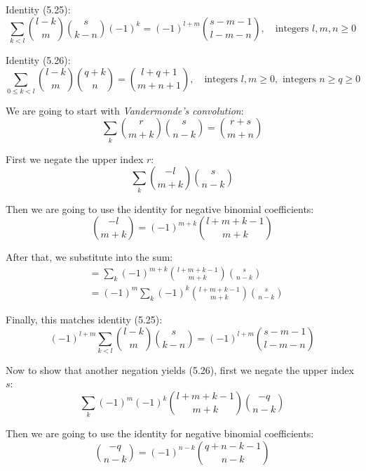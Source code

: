 \documentclass[12pt]{article}
\begin{document}
Identity (5.25):
\begin{equation}
    \sum_{k < l} \binom{l-k}{m} \binom{s}{k-n} {(-1)}^k = {(-1)}^{l+m} \binom{s-m-1}{l-m-n}, \quad \text{integers } l, m, n \geq 0
\end{equation}

Identity (5.26):
\begin{equation}
    \sum_{0 \le k < l} \binom{l-k}{m} \binom{q+k}{n} = \binom{l+q+1}{m+n+1}, \quad \text{integers } l, m \geq 0, \text{ integers } n \geq q \geq 0
\end{equation}

We are going to start with \textit{Vandermonde's convolution}:
\begin{equation}
    \sum_{k} \binom{r}{m+k} \binom{s}{n-k} = \binom{r+s}{m+n}
\end{equation}

First we negate the upper index \( r \):
\begin{equation}
    \sum_{k} \binom{-l}{m+k} \binom{s}{n-k}
\end{equation}

Then we are going to use the identity for negative binomial coefficients:
\begin{equation}
    \binom{-l}{m+k} = {(-1)}^{m+k} \binom{l+m+k-1}{m+k}
\end{equation}

After that, we substitute into the sum:
\begin{align*}
    &= \sum_{k} {(-1)}^{m+k} \binom{l+m+k-1}{m+k} \binom{s}{n-k} \\
    &= {(-1)}^m \sum_{k} {(-1)}^k \binom{l+m+k-1}{m+k} \binom{s}{n-k}
\end{align*}

Finally, this matches identity (5.25):
\begin{equation}
    {(-1)}^{l+m} \sum_{k < l} \binom{l-k}{m} \binom{s}{k-n} = {(-1)}^{l+m} \binom{s-m-1}{l-m-n}
\end{equation}

Now to show that another negation yields (5.26), first we negate the upper index \( s \):
\begin{equation}
    \sum_{k} {(-1)}^m {(-1)}^k \binom{l+m+k-1}{m+k} \binom{-q}{n-k}
\end{equation}

Then we are going to use the identity for negative binomial coefficients:
\begin{equation}
    \binom{-q}{n-k} = {(-1)}^{n-k} \binom{q+n-k-1}{n-k}
\end{equation}
\end{document}
